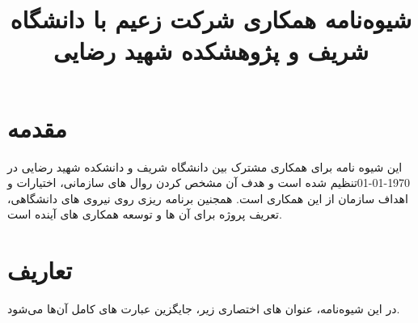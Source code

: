 \title{شیوه‌نامه همکاری شرکت زعیم با دانشگاه شریف و پژوهشکده شهید رضایی}


	\pagestyle{fancy}
	
\maketitle

\section*{مقدمه}

 این شیوه نامه برای همکاری مشترک بین دانشگاه شریف و دانشکده شهید رضایی در \today تنظیم شده است و هدف آن مشخص کردن روال های سازمانی، اختیارات و اهداف سازمان از این همکاری است. همجنین برنامه ریزی روی نیروی های دانشگاهی، تعریف پروژه برای آن ها و توسعه همکاری های آینده است.


\section{تعاریف}

در این شیوه‌نامه، عنوان های اختصاری زیر، جایگزین عبارت های کامل آن‌ها می‌شود.

